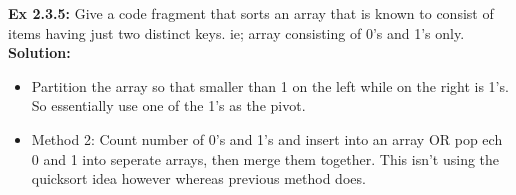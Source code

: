 \documentclass[11pt,fleqn]{article}
\begin{document}
\textbf{Ex 2.3.5:} Give a code fragment that sorts an array that is known to consist of items having
just two distinct keys. ie; array consisting of 0's and 1's only.\\

\textbf{Solution:}\\
\begin{itemize}
	\item Partition the array so that smaller than 1 on the left while on the right is 1's. So essentially use one of the 1's as the pivot.
	\item Method 2: Count number of 0's and 1's and insert into an array OR pop ech 0 and 1 into seperate arrays, then merge them together. This isn't using the quicksort idea however whereas previous method does.
\end{itemize}
\end{document}
